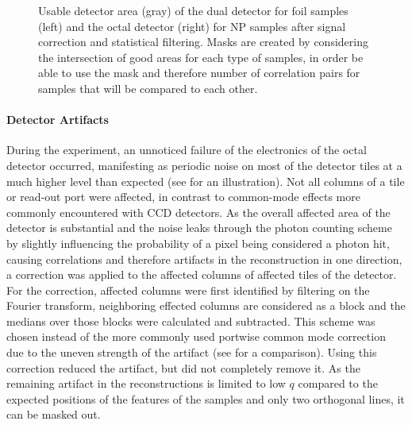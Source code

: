 \begin{figure}
\begin{subfigure}{0.3\textwidth}
	\end{subfigure}
	\caption[Usable detector area]{Usable detector area (gray) of the dual detector for foil samples (left) and the octal detector (right) for NP samples after signal correction and statistical filtering. Masks are created by considering the intersection of good areas for each type of samples, in order be able to use the mask and therefore number of correlation pairs for samples that will be compared to each other.}	
	\label{fig:mask}
\end{figure}

\paragraph{Detector Artifacts}
During the experiment, an unnoticed failure of the electronics of the octal detector occurred, manifesting as periodic noise on most of the detector tiles at a much higher level than expected (see  for an illustration). Not all columns of a tile or read-out port were affected, in contrast to common-mode effects more commonly encountered with CCD detectors. As the overall affected area of the detector is substantial and the noise leaks through the photon counting scheme by slightly influencing the probability of a pixel being considered a photon hit, causing correlations and therefore artifacts in the reconstruction in one direction, a correction was applied to the affected columns of affected tiles of the detector. For the correction, affected columns were first identified by filtering on the Fourier transform, neighboring effected columns are considered as a block and the medians over those blocks were calculated and subtracted. This scheme was chosen instead of the more commonly used portwise common mode correction due to the uneven strength of the artifact (see  for a comparison). Using this correction reduced the artifact, but did not completely remove it. As the remaining artifact in the reconstructions is limited to low $q$ compared to the expected positions of the features of the samples and only two orthogonal lines, it can be masked out.


